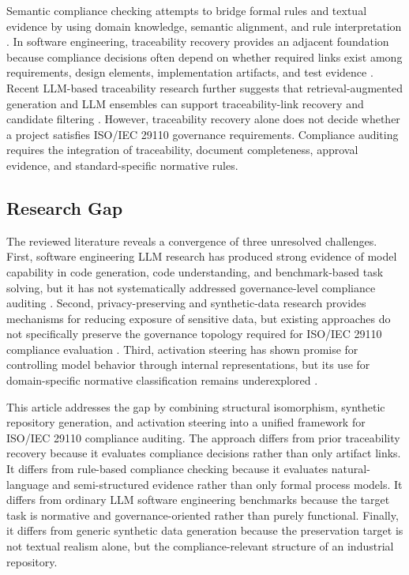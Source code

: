 \documentclass{ieeeaccess}
\begin{document}
Semantic compliance checking attempts to bridge formal rules and textual evidence by using domain knowledge, semantic alignment, and rule interpretation \cite{guo2021semantic,zheng2022semantic}. In software engineering, traceability recovery provides an adjacent foundation because compliance decisions often depend on whether required links exist among requirements, design elements, implementation artifacts, and test evidence \cite{antoniol2002traceability,borg2013traceability}. Recent LLM-based traceability research further suggests that retrieval-augmented generation and LLM ensembles can support traceability-link recovery and candidate filtering \cite{fuchss2025lissa,fuchss2025llmtrace}. However, traceability recovery alone does not decide whether a project satisfies ISO/IEC 29110 governance requirements. Compliance auditing requires the integration of traceability, document completeness, approval evidence, and standard-specific normative rules.

\subsection{Research Gap}
\label{subsec:rw_gap}

The reviewed literature reveals a convergence of three unresolved challenges. First, software engineering LLM research has produced strong evidence of model capability in code generation, code understanding, and benchmark-based task solving, but it has not systematically addressed governance-level compliance auditing \cite{jiang2024surveycodegen,lu2021codexglue,jimenez2023swebench,jain2024livecodebench}. Second, privacy-preserving and synthetic-data research provides mechanisms for reducing exposure of sensitive data, but existing approaches do not specifically preserve the governance topology required for ISO/IEC 29110 compliance evaluation \cite{bauer2024syntheticdata,dwork2006differentialprivacy,mcmahan2017communication,yang2025swesmith}. Third, activation steering has shown promise for controlling model behavior through internal representations, but its use for domain-specific normative classification remains underexplored \cite{zou2023representation,turner2023activation,li2023iti}.

This article addresses the gap by combining structural isomorphism, synthetic repository generation, and activation steering into a unified framework for ISO/IEC 29110 compliance auditing. The approach differs from prior traceability recovery because it evaluates compliance decisions rather than only artifact links. It differs from rule-based compliance checking because it evaluates natural-language and semi-structured evidence rather than only formal process models. It differs from ordinary LLM software engineering benchmarks because the target task is normative and governance-oriented rather than purely functional. Finally, it differs from generic synthetic data generation because the preservation target is not textual realism alone, but the compliance-relevant structure of an industrial repository.
\end{document}
